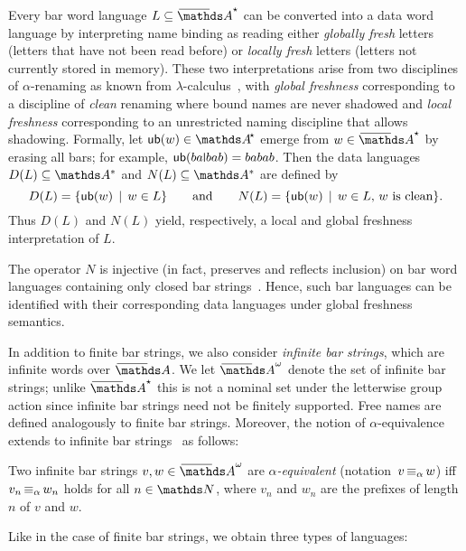 \documentclass[a4paper,UKenglish,cleveref,autoref,thm-restate,numberwithinsect,final]{lipics-v2021}
\begin{document}
    Every bar word language $L \seq \barAs$ can be converted into a data word language by interpreting name binding as reading either \emph{globally fresh} letters (letters that have not been read before) or \emph{locally fresh} letters (letters not currently stored in memory).
    These two interpretations arise from two disciplines of $\alpha$-renaming as known from $\lambda$-calculus~\cite{barendregt85}, with \emph{global freshness} corresponding to a discipline of \emph{clean} renaming where bound names are never shadowed and \emph{local freshness} corresponding to an unrestricted naming discipline that allows shadowing. Formally, let $\ub(w)\in \Ats$ emerge from $w\in \barAs$ by erasing all bars; for example, $\ub(ba\newletter{b}ab)=babab$. Then the data languages $D(L)\seq \names^*$ and $N(L)\seq \names^*$ are defined by
    \begin{equation}\label{eq:ND}
    D(L) = \{{\mathsf{ub}}(w)\,\mid\,w \in L\}  \qquad \text{and}\qquad N(L) = \{{\mathsf{ub}}(w)\,\mid\,\text{$w \in L$, $w$ is clean}\}.    \end{equation}
    Thus $D(L)$ and $N(L)$ yield, respectively, a local and global freshness interpretation of $L$.

 The operator $N$ is injective (in fact, preserves and reflects inclusion) on bar word
    languages containing only closed bar strings~\cite[Lemma~A.3]{skmw17}. Hence, such bar languages can be identified with their corresponding data languages under global freshness semantics.

    In addition to finite bar strings, we also consider \emph{infinite bar strings}, which are infinite words
    over $\barNames$. We let $\barAw$ denote the set of infinite bar strings; unlike $\barAs$ this is not a nominal set under the letterwise group action since infinite bar strings need not be finitely supported.  
    Free names are defined analogously to finite bar strings. Moreover, the notion of $\alpha$-equivalence extends to
     infinite bar strings~\cite{uhms21} as follows:

    \begin{defn}
        Two infinite bar strings $v, w \in \barAw$ are \emph{$\alpha$-equivalent} (notation~$v \operatorname{\equiv_{\alpha}} w$) iff
        $v_n \operatorname{\equiv_{\alpha}} w_n$ holds for all $n \in \Nat$, where $v_n$ and $w_n$ are the prefixes of length $n$ of $v$
        and $w$.
    \end{defn}

    Like in the case of finite bar strings, we obtain three types of languages:
\end{document}
